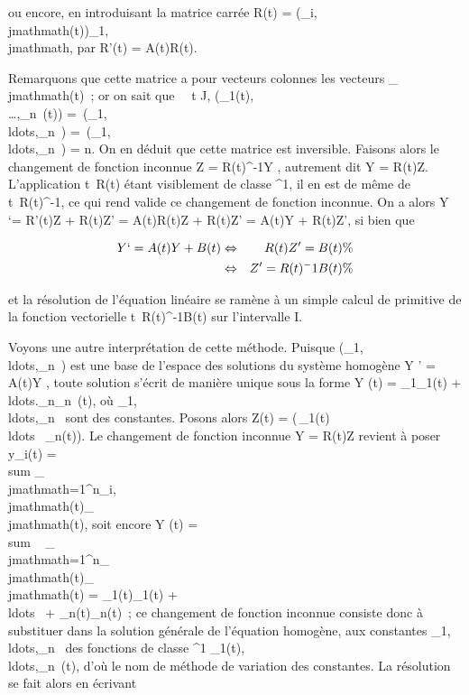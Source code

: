 \documentclass[]{article}
\begin{document}
ou encore, en introduisant la matrice carrée R(t) =
(\psi_i,\\jmathmath(t))_1\leqi,\\jmathmath\leqn, par R'(t) = A(t)R(t).

Remarquons que cette matrice a pour vecteurs colonnes les vecteurs
\Phi_\\jmathmath(t)~; or on sait que \forall~~t \in J,
\mathrmrg(\Phi_1(t),\\\ldots,\Phi_n~(t))
=\
\mathrmrg(\Phi_1,\\ldots,\Phi_n~)
=\
\mathrmrg(\phi_1,\\ldots,\phi_n~)
= n. On en déduit que cette matrice est inversible. Faisons alors le
changement de fonction inconnue Z = R(t)^-1Y , autrement dit
Y = R(t)Z. L'application t\mapsto~R(t) étant
visiblement de classe \mathcal{C}^1, il en est de même de
t\mapsto~R(t)^-1, ce qui rend valide ce
changement de fonction inconnue. On a alors Y `= R'(t)Z + R(t)Z' =
A(t)R(t)Z + R(t)Z' = A(t)Y + R(t)Z', si bien que

\begin{align*} Y `= A(t)Y + B(t)&
\Leftrightarrow & R(t)Z' = B(t) \%&
\\ & \Leftrightarrow & Z' =
R(t)^-1B(t)\%& \\
\end{align*}

et la résolution de l'équation linéaire se ramène à un simple calcul de
primitive de la fonction vectorielle
t\mapsto~R(t)^-1B(t) sur l'intervalle I.

Voyons une autre interprétation de cette méthode. Puisque
(\Phi_1,\\ldots,\Phi_n~)
est une base de l'espace des solutions du système homogène Y ' = A(t)Y ,
toute solution s'écrit de manière unique sous la forme Y (t) =
\lambda_1\Phi_1(t) +
\\ldots.\lambda_n\Phi_n~(t),
où
\lambda_1,\\ldots,\lambda_n~
sont des constantes. Posons alors Z(t) = \left
(\matrix\,\lambda_1(t)
\cr
\\ldots~
\cr \lambda_n(t)\right ). Le
changement de fonction inconnue Y = R(t)Z revient à poser
y_i(t) =\ \\sum
 _\\jmathmath=1^n\psi_i,\\jmathmath(t)\lambda_\\jmathmath(t), soit encore Y
(t) = \\sum ~
_\\jmathmath=1^n\lambda_\\jmathmath(t)\Phi_\\jmathmath(t) =
\lambda_1(t)\Phi_1(t) +
\\ldots~ +
\lambda_n(t)\Phi_n(t)~; ce changement de fonction inconnue
consiste donc à substituer dans la solution générale de l'équation
homogène, aux constantes
\lambda_1,\\ldots,\lambda_n~
des fonctions de classe ^1
\lambda_1(t),\\ldots,\lambda_n~(t),
d'où le nom de méthode de variation des constantes. La résolution se
fait alors en écrivant
\end{document}
